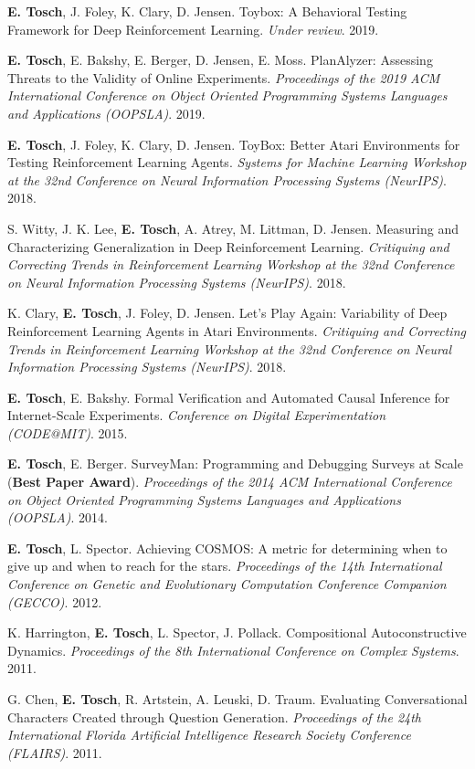 \documentclass[10pt]{article}
\newcommand{\cvsec}[2]{
    \begin{tcolorbox}[width=\textwidth, breakable, title={#1}]
        #2
    \end{tcolorbox}
    \vspace{10pt}
}
\newcommand{\pub}[4]{
  \parbox{\textwidth}{
    #1. #2. \textit{#3}. #4.
    \vspace{5pt}
  }
}
\newcommand{\me}{\textbf{E. Tosch}}
\begin{document}
\cvsec{Publications}{
  \pub{\me{}, J. Foley, K. Clary, D. Jensen}{Toybox: A Behavioral Testing Framework for Deep Reinforcement Learning}{Under review}{2019}
  \pub{\me{}, E. Bakshy, E. Berger, D. Jensen, E. Moss}{PlanAlyzer: Assessing Threats to the Validity of Online Experiments}{Proceedings of the 2019 ACM International Conference on Object Oriented Programming Systems Languages and Applications (OOPSLA)}{2019}
  \pub{\me{}, J. Foley, K. Clary, D. Jensen}{ToyBox: Better Atari Environments for Testing Reinforcement Learning Agents}{Systems for Machine Learning Workshop at the 32nd Conference on Neural Information Processing Systems (NeurIPS)}{2018}
  \pub{S. Witty, J. K. Lee, \me{}, A. Atrey, M. Littman, D. Jensen}{Measuring and Characterizing Generalization in Deep Reinforcement Learning}{Critiquing and Correcting Trends in Reinforcement Learning Workshop at the 32nd Conference on Neural Information Processing Systems (NeurIPS)}{2018}
  \pub{K. Clary, \me{}, J. Foley, D. Jensen}{Let's Play Again: Variability of Deep Reinforcement Learning Agents in Atari Environments}{Critiquing and Correcting Trends in Reinforcement Learning Workshop at the 32nd Conference on Neural Information Processing Systems (NeurIPS)}{2018}
  \pub{\me{}, E. Bakshy}{Formal Verification and Automated Causal Inference for Internet-Scale Experiments}{Conference on Digital Experimentation (CODE@MIT)}{2015}
  \pub{\me{}, E. Berger}{SurveyMan: Programming and Debugging Surveys at Scale (\textbf{Best Paper Award})}{Proceedings of the 2014 ACM International Conference on Object Oriented Programming Systems Languages and Applications (OOPSLA)}{2014}
  \pub{\me{}, L. Spector}{Achieving COSMOS: A metric for determining when to give up and when to reach for the stars}{Proceedings of the 14th International Conference on Genetic and Evolutionary Computation Conference Companion (GECCO)}{2012}
  \pub{K. Harrington, \me{}, L. Spector, J. Pollack}{Compositional Autoconstructive Dynamics}{Proceedings of the 8th International Conference on Complex Systems}{2011}
  \pub{G. Chen, \me{}, R. Artstein, A. Leuski, D. Traum}{Evaluating Conversational Characters Created through Question Generation}{Proceedings of the 24th International Florida Artificial Intelligence Research Society Conference (FLAIRS)}{2011}
}
\end{document}
